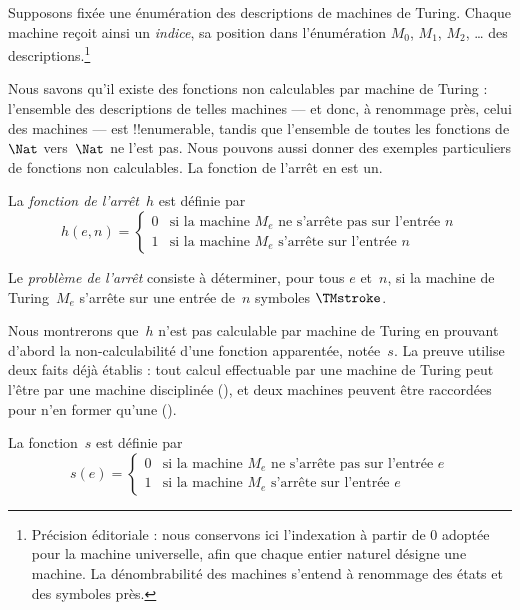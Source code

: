 \documentclass[../../../include/open-logic-section]{subfiles}
\begin{document}

\begin{explain}
Supposons fixée une énumération des descriptions de machines de
Turing. Chaque machine reçoit ainsi un \emph{indice}, sa position
dans l'énumération $M_0$, $M_1$, $M_2$, \dots{} des descriptions.\footnote{Précision éditoriale : nous conservons ici l'indexation à partir de $0$ adoptée pour la machine universelle, afin que chaque entier naturel désigne une machine. La dénombrabilité des machines s'entend à renommage des états et des symboles près.}

Nous savons qu'il existe des fonctions non calculables par machine
de Turing : l'ensemble des descriptions de telles machines ---
et donc, à renommage près, celui des machines --- est
!!{enumerable}, tandis que l'ensemble de toutes les fonctions
de $\Nat$ vers~$\Nat$ ne l'est pas. Nous pouvons aussi donner
des exemples particuliers de fonctions non calculables.
La fonction de l'arrêt en est un.
\end{explain}

\begin{defn}
La \emph{fonction de l'arrêt}~$h$ est définie par
\[
h(e,n) =
\begin{cases}
  \text{0} & \text{si la machine~$M_e$ ne s'arrête pas sur l'entrée~$n$} \\
  \text{1} & \text{si la machine~$M_e$ s'arrête sur l'entrée~$n$}
\end{cases}
\]
\end{defn}

\begin{defn}
Le \emph{problème de l'arrêt} consiste à déterminer, pour tous
$e$ et~$n$, si la machine de Turing~$M_e$ s'arrête sur une entrée
de~$n$ symboles $\TMstroke$.
\end{defn}

\begin{explain}
Nous montrerons que~$h$ n'est pas calculable par machine de Turing
en prouvant d'abord la non-calculabilité d'une fonction apparentée,
notée~$s$. La preuve utilise deux faits déjà établis : tout calcul
effectuable par une machine de Turing peut l'être par une machine
disciplinée (), et deux machines peuvent
être raccordées pour n'en former qu'une ().
\end{explain}

\begin{defn}
La fonction~$s$ est définie par
\[
s(e) =
\begin{cases}
  \text{0} & \text{si la machine~$M_e$ ne s'arrête pas sur l'entrée~$e$} \\
  \text{1} & \text{si la machine~$M_e$ s'arrête sur l'entrée~$e$}
\end{cases}
\]
\end{defn}
\end{document}
